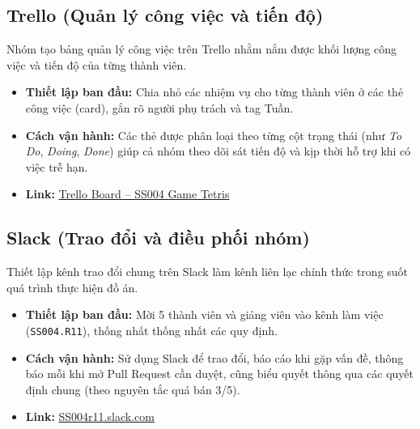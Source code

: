 \documentclass[a4paper]{article}
\begin{document}
\subsection{Trello (Quản lý công việc và tiến độ)}
Nhóm tạo bảng quản lý công việc trên Trello nhằm nắm được khối lượng công việc và tiến độ của từng thành viên.
\begin{itemize}

    \item \textbf{Thiết lập ban đầu:} Chia nhỏ các nhiệm vụ cho từng thành viên ở các thẻ công việc (card), gắn rõ người phụ trách và tag Tuần.
    \item \textbf{Cách vận hành:} Các thẻ được phân loại theo từng cột trạng thái (như \textit{To Do}, \textit{Doing}, \textit{Done}) giúp cả nhóm theo dõi sát tiến độ và kịp thời hỗ trợ khi có việc trễ hạn.
    
    \item \textbf{Link:} \href{https://trello.com/invite/b/6af84160c54fc0dafaafce3b/ATTI29c2d3e7597facc604c6370312c5b80052E181AA/dồ-an-cuối-kỳ-ss004}{Trello Board – SS004 Game Tetris} 
\end{itemize}

\subsection{Slack (Trao đổi và điều phối nhóm)}
Thiết lập kênh trao đổi chung trên Slack làm kênh liên lạc chính thức trong suốt quá trình thực hiện đồ án.
\begin{itemize}
    \item \textbf{Thiết lập ban đầu:} Mời 5 thành viên và giảng viên vào kênh làm việc (\texttt{SS004.R11}), thống nhất thống nhất các quy định.
    \item \textbf{Cách vận hành:} Sử dụng Slack để trao đổi, báo cáo khi gặp vấn đề, thông báo mỗi khi mở Pull Request cần duyệt, cũng biểu quyết thông qua các quyết định chung (theo nguyên tắc quá bán 3/5).

    \item \textbf{Link:} \href{https://ss004r11.slack.com/archives/C0CH1U6903G}{SS004r11.slack.com}
    
\end{itemize}
\end{document}
